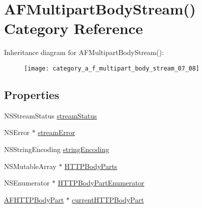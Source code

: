 \hypertarget{category_a_f_multipart_body_stream_07_08}{\section{A\-F\-Multipart\-Body\-Stream() Category Reference}
\label{category_a_f_multipart_body_stream_07_08}
}
Inheritance diagram for A\-F\-Multipart\-Body\-Stream()\-:\begin{figure}[H]
\begin{center}
\leavevmode
\texttt{[image: category\_a\_f\_multipart\_body\_stream\_07\_08]}
\end{center}
\end{figure}
\subsection*{Properties}
\begin{DoxyCompactItemize}
\item 
N\-S\-Stream\-Status \hyperlink{category_a_f_multipart_body_stream_07_08_ad9f5c15c88c1f3731d0a86d696a39311}{stream\-Status}
\item 
N\-S\-Error $\ast$ \hyperlink{category_a_f_multipart_body_stream_07_08_a9726eb064312c0dce3eb57858ed862a9}{stream\-Error}
\item 
N\-S\-String\-Encoding \hyperlink{category_a_f_multipart_body_stream_07_08_a24375ab1dd4d3576eff24e5c9346c83c}{string\-Encoding}
\item 
N\-S\-Mutable\-Array $\ast$ \hyperlink{category_a_f_multipart_body_stream_07_08_a167d5df6c437a8a93b46de309d067198}{H\-T\-T\-P\-Body\-Parts}
\item 
N\-S\-Enumerator $\ast$ \hyperlink{category_a_f_multipart_body_stream_07_08_a2e5468c86b09e6a3cb14b812155f86ea}{H\-T\-T\-P\-Body\-Part\-Enumerator}
\item 
\hyperlink{interface_a_f_h_t_t_p_body_part}{A\-F\-H\-T\-T\-P\-Body\-Part} $\ast$ \hyperlink{category_a_f_multipart_body_stream_07_08_a95852aefe9011210705d91b29c7fa620}{current\-H\-T\-T\-P\-Body\-Part}
\end{DoxyCompactItemize}


